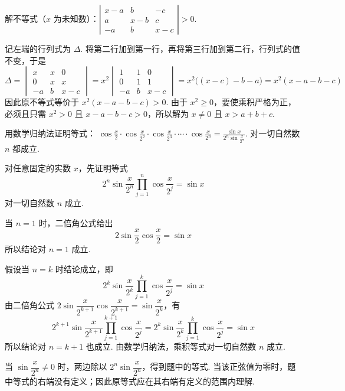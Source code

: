 \begin{problem}
解不等式（\(x\) 为未知数）：\( \left|\begin{matrix}x-a & b & -c \\ a & x-b & c \\ -a & b & x-c\end{matrix}\right| > 0 \).
\end{problem}

\begin{solution}
记左端的行列式为 \(\Delta\). 将第二行加到第一行，再将第三行加到第二行，行列式的值不变，于是
\[
\Delta=\begin{vmatrix}x&x&0\\0&x&x\\-a&b&x-c\end{vmatrix}
=x^2\begin{vmatrix}1&1&0\\0&1&1\\-a&b&x-c\end{vmatrix}
=x^2\bigl((x-c)-b-a\bigr)=x^2(x-a-b-c)
\]
因此原不等式等价于 \(x^2(x-a-b-c)>0\). 由于 \(x^2\geqslant0\)，要使乘积严格为正，必须且只需 \(x^2>0\) 且 \(x-a-b-c>0\)，所以解为 \(x\ne0\) 且 \(x>a+b+c\).
\end{solution}

\begin{problem}
用数学归纳法证明等式： \(\cos \frac{x}{2} \cdot \cos \frac{x}{2^2} \cdot \cos \frac{x}{2^3} \cdot \cdots \cdot \cos \frac{x}{2^n} = \frac{\sin x}{2^n \sin \frac{x}{2^n}}\). 对一切自然数 \(n\) 都成立.
\end{problem}

\begin{solution}
对任意固定的实数 \(x\)，先证明等式
\[
2^n\sin\frac{x}{2^n}\prod_{j=1}^{n}\cos\frac{x}{2^j}=\sin x
\]
对一切自然数 \(n\) 成立.

当 \(n=1\) 时，二倍角公式给出
\[
2\sin\frac{x}{2}\cos\frac{x}{2}=\sin x
\]
所以结论对 \(n=1\) 成立.

假设当 \(n=k\) 时结论成立，即
\[
2^k\sin\frac{x}{2^k}\prod_{j=1}^{k}\cos\frac{x}{2^j}=\sin x
\]
由二倍角公式 \(2\sin\dfrac{x}{2^{k+1}}\cos\dfrac{x}{2^{k+1}}=\sin\dfrac{x}{2^k}\)，有
\[
2^{k+1}\sin\frac{x}{2^{k+1}}\prod_{j=1}^{k+1}\cos\frac{x}{2^j}
=2^k\sin\frac{x}{2^k}\prod_{j=1}^{k}\cos\frac{x}{2^j}=\sin x
\]
所以结论对 \(n=k+1\) 也成立. 由数学归纳法，乘积等式对一切自然数 \(n\) 成立.

当 \(\sin\dfrac{x}{2^n}\ne0\) 时，两边除以 \(2^n\sin\dfrac{x}{2^n}\)，得到题中的等式. 当该正弦值为零时，题中等式的右端没有定义；因此原等式应在其右端有定义的范围内理解.
\end{solution}

